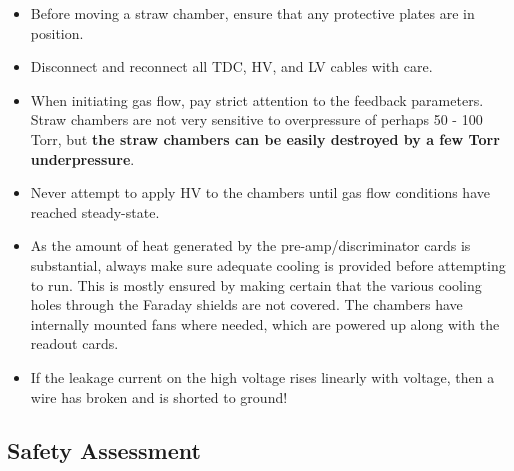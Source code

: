 {\begin{itemize}

\item{Before moving a straw chamber, ensure that any protective
plates are in position.}

\item{Disconnect and reconnect all TDC, HV, and LV cables with care.}

\item{When initiating gas flow, pay strict attention to the feedback
parameters.
Straw chambers are not very sensitive to overpressure of perhaps
50 - 100 Torr,
but {\bf the straw chambers can be easily destroyed by a few Torr 
underpressure}. }

\item{Never attempt to apply HV to the chambers until gas flow
conditions have reached steady-state.}

\item{As the amount of heat generated by the pre-amp/discriminator
cards is substantial, always make sure adequate cooling is provided
before attempting to run.
This is mostly ensured by making certain that the various
cooling holes through the Faraday shields are not covered.
The chambers have internally mounted fans where needed, which
are powered up along with the readout cards.}

\item{If the leakage current on the high voltage rises linearly
with voltage, then a wire has broken and
is shorted to ground!}

\end{itemize}

} %

\begin{safetyen}{0}{0}
\section{Safety Assessment}
\label{sec:fpp_safety}
\end{safetyen}

